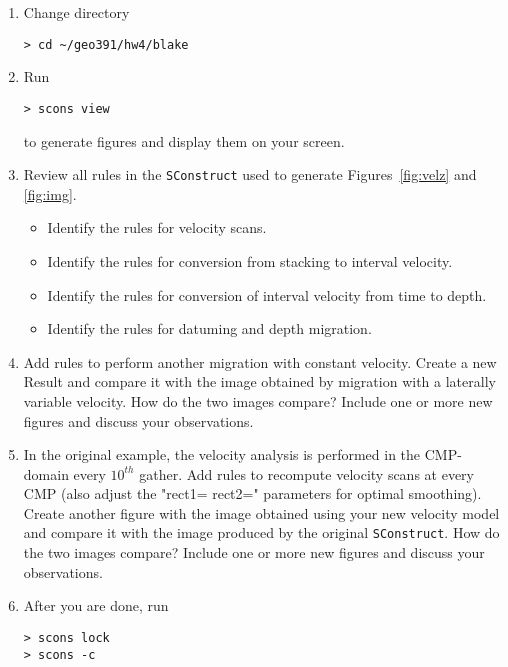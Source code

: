 





\begin{enumerate}
\item Change directory 

\begin{verbatim}
> cd ~/geo391/hw4/blake
\end{verbatim}
  \item Run
\begin{verbatim}
> scons view
\end{verbatim}
to generate figures and display them on your screen.  

\item
Review all rules in the \texttt{SConstruct} used to generate
Figures~\ref{fig:velz} and \ref{fig:img}.
\begin{itemize}
\item Identify the rules for velocity scans.
\item Identify the rules for conversion from stacking
to interval velocity.
\item Identify the rules for conversion of interval velocity
from time to depth.
\item Identify the rules for datuming and depth migration.
\end{itemize}

\item
Add rules to perform another migration with constant velocity.
Create a new Result and compare it with the image
obtained by migration with a laterally variable velocity.
How do the two images compare?
Include one or more new figures and discuss your 
observations.


\item
In the original example, the velocity analysis
is performed in the CMP-domain every $10^{th}$ gather.
Add rules to recompute velocity scans at every CMP
(also adjust the "rect1= rect2=" parameters for optimal 
smoothing). 
Create another figure with the image obtained using
your new velocity model and compare it with the image
produced by the original \texttt{SConstruct}.
How do the two images compare?
Include one or more new figures and discuss your 
observations.


\item After you are done, run

\begin{verbatim}
> scons lock
> scons -c
\end{verbatim} 
  
\end{enumerate}


